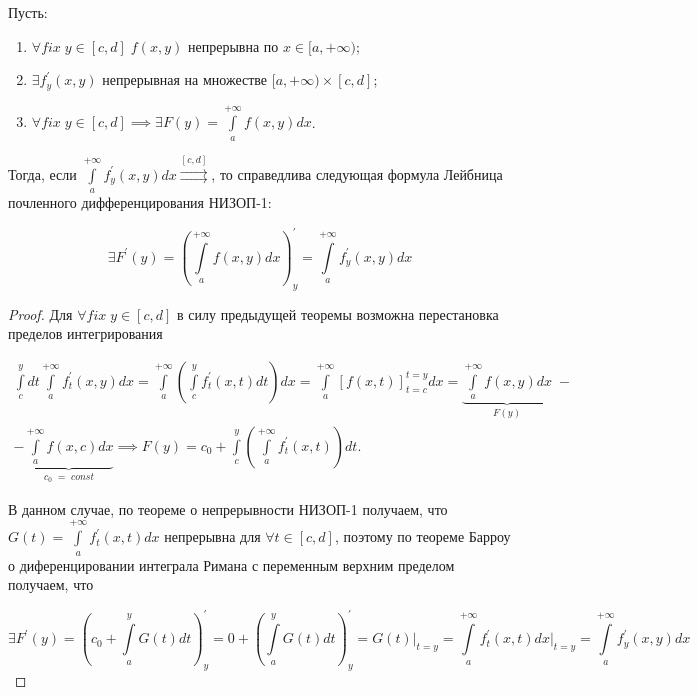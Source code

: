 \documentclass[../../main.tex]{subfiles}
\begin{document}
\begin{thm}
	Пусть: 
	\begin{enumerate}
		\item $\forall fix \; y \in [c, d] \; f(x, y)$ непрерывна по $x \in [a, +\infty)$;
		\item $\exists f^{'}_y (x, y)$ непрерывная на множестве $[a, +\infty) \times [c, d]$;
		\item $\forall fix \; y \in [c, d] \implies \exists F(y) = \int\limits_a^{+\infty} f(x, y) dx$.
	\end{enumerate}
	Тогда, если $\displaystyle \int\limits_a^{+\infty} f^{'}_y (x, y) dx \overset{[c, d]}{\rightrightarrows}$, то справедлива следующая формула Лейбница почленного дифференцирования НИЗОП-1:
	
	\begin{equation} \label{lec11:2}
		\exists F^{'}(y) = \left( \int\limits_a^{+\infty} f(x, y) dx \right)^{'}_y = \int\limits_a^{+\infty} f^{'}_y (x, y) dx 
	\end{equation}
	
	\begin{proof}
		Для $\forall fix \; y \in [c, d]$ в силу предыдущей теоремы возможна перестановка пределов интегрирования
		
		\begin{equation*}
		\begin{gathered}
		\int\limits_c^y dt \int\limits_a^{+\infty} f^{'}_{t}(x, y) dx =
		\int\limits_a^{+\infty} \left( \int\limits_c^y f^{'}_{t} (x, t) dt \right) dx =
		\int\limits_a^{+\infty} \left[ f(x, t) \right]_{t = c}^{t = y} dx
		= \underbrace{\int\limits_a^{+\infty} f(x, y) dx}_{F(y)}\;- \\
		- \underbrace{\int\limits_a^{+\infty} f (x, c) dx}_{c_0\;=\;const} \implies 
		F(y) = c_0 + \int\limits_c^y \left( \int\limits_a^{+\infty} f^{'}_{t} (x, t) \right) dt.
		\end{gathered}
		\end{equation*}
		
		В данном случае, по теореме о непрерывности НИЗОП-1 получаем, что $G(t) = \int\limits_a^{+\infty} f_{t}^{'}(x, t) dx$ непрерывна для $\forall t \in [c, d]$, поэтому по теореме Барроу о диференцировании интеграла Римана с переменным верхним пределом получаем, что
		
		$$
		\exists F^{'}(y) = (c_0 + \int\limits_a^y G(t)dt)^{'}_y = 0 + (\int\limits_a^y G(t)dt)^{'}_y = G(t)\bigg|_{t = y} = \int\limits_a^{+\infty} f^{'}_t (x, t) dx\bigg|_{t = y} = \int\limits^{+\infty}_a  f^{'}_y (x, y) dx
		$$ 
	\end{proof}
	
\end{thm}
\end{document}
